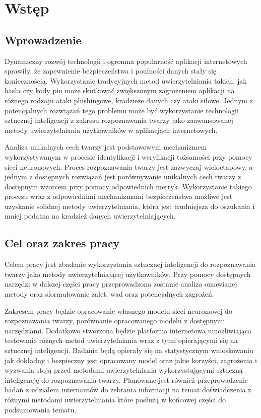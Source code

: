 \chapter{Wstęp}
\section{Wprowadzenie}
Dynamiczny rozwój technologii i ogromna popularność aplikacji internetowych sprawiły, że zapewnienie bezpieczeństwa i poufności danych stały się koniecznością. Wykorzystanie tradycyjnych metod uwierzytelniania takich, jak hasła czy kody pin może skutkować zwiększonym zagrożeniem aplikacji na różnego rodzaju ataki phishingowe, kradzieże danych czy ataki siłowe. Jednym z potencjalnych rozwiązań tego problemu może być wykorzystanie technologii sztucznej inteligencji z zakresu rozpoznawania twarzy jako zaawansowanej metody uwierzytelniania użytkowników w aplikacjach internetowych.

Analiza unikalnych cech twarzy jest podstawowym mechanizmem wykorzystywanym w procesie identyfikacji i weryfikacji tożsamości przy pomocy sieci neuronowych. Proces rozpoznawania twarzy jest zazwyczaj wieloetapowy, a jednym z dostępnych rozwiązań jest porównywanie unikalnych cech twarzy z dostępnym wzorcem przy pomocy odpowiednich metryk. Wykorzystanie takiego procesu wraz z odpowiednimi mechanizmami bezpieczeństwa możliwe jest uzyskanie solidnej metody uwierzytelniania, która jest trudniejsza do oszukania i mniej podatna na kradzież danych uwierzytelniających.
\section{Cel oraz zakres pracy}
Celem pracy jest zbadanie wykorzystania sztucznej inteligencji do rozpoznawania twarzy jako metody uwierzytelniającej użytkowników. Przy pomocy dostępnych narzędzi w dalszej części pracy przeprowadzona zostanie analiza omawianej metody oraz sformułowanie zalet, wad oraz potencjalnych zagrożeń.

Zakresem pracy będzie opracowanie własnego modelu sieci neuronowej do rozpoznawania twarzy, porównanie opracowanego modelu z dostępnymi narzędziami. Dodatkowo stworzona będzie platforma internetowa umożliwiająca testowanie różnych metod uwierzytelniania wraz z tymi opierającymi się na sztucznej inteligencji. Badania będą opierały się na statystycznym wnioskowaniu jak dokładny i bezpieczny jest opracowany model oraz jakie korzyści, zagrożenia i wyzwania stoją przed metodami uwierzytelniania wykorzystującymi sztuczną inteligencję do rozpoznawania twarzy. Planowane jest również przeprowadzenie badań z udziałem internautów do zebrania informacji na temat doświadczenia z różnymi metodami uwierzytelniania które posłużą w końcowej części do podsumowania tematu.

